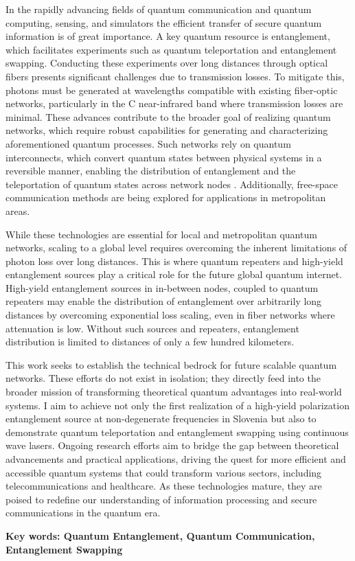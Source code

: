 \documentclass{article}
\theoremstyle{mytheoremstyle}
\theoremstyle{mytheoremstyle}
\theoremstyle{myproblemstyle}
\begin{document}
In the rapidly advancing fields of quantum communication and quantum computing, sensing, and simulators
the efficient transfer of secure quantum information is of great importance.
A key quantum resource is entanglement, which facilitates experiments such as quantum teleportation and entanglement swapping.
Conducting these experiments over long distances through optical fibers presents significant challenges due to transmission losses.
To mitigate this, photons must be generated at wavelengths compatible with existing fiber-optic networks,
particularly in the C near-infrared band where transmission losses are minimal.
These advances contribute to the broader goal of realizing quantum networks,
which require robust capabilities for generating and characterizing aforementioned quantum processes. %
Such networks rely on quantum interconnects, which convert quantum states between physical systems in a reversible manner,
enabling the distribution of entanglement and the teleportation of quantum states across network nodes \cite{Kimble_2008}.
Additionally, free-space communication methods \cite{Kržić_et_al_2023} are being explored for applications in metropolitan areas.
\par While these technologies are essential for local and metropolitan quantum networks, scaling to a global level requires overcoming
the inherent limitations of photon loss over long distances. This is where quantum repeaters and high-yield entanglement sources
play a critical role for the future global quantum internet. High-yield entanglement sources in in-between nodes, coupled to
quantum repeaters may enable the distribution of entanglement over arbitrarily long distances by overcoming exponential loss scaling,
even in fiber networks where attenuation is low. Without such sources and repeaters, entanglement distribution is limited to distances
of only a few hundred kilometers.
\par This work seeks to establish the technical bedrock for future scalable quantum networks. These efforts do not exist in isolation;
they directly feed into the broader mission of transforming theoretical quantum advantages into real-world systems.
I aim to achieve not only the first realization of a high-yield polarization entanglement source at non-degenerate
frequencies in Slovenia but also to demonstrate quantum teleportation and entanglement swapping using continuous wave lasers.
Ongoing research efforts aim to bridge the gap between theoretical advancements and practical applications,
driving the quest for more efficient and accessible quantum systems that could transform various sectors,
including telecommunications and healthcare. As these technologies mature, they are poised to redefine our
understanding of information processing and secure communications in the quantum era.
\par\textbf{Key words: Quantum Entanglement, Quantum Communication, Entanglement Swapping}
\end{document}
